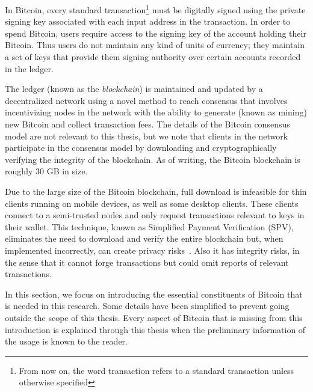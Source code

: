 In Bitcoin, every standard transaction\footnote{From now on, the word transaction refers to a standard transaction unless otherwise specified} must be digitally signed using the private signing key associated with each input address in the transaction. In order to spend Bitcoin, users require access to the signing key of the account holding their Bitcoin. Thus users do not maintain any kind of units of currency; they maintain a set of keys that provide them signing authority over certain accounts recorded in the ledger. 

The ledger (known as the \emph{blockchain}) is maintained and updated by a decentralized network using a novel method to reach consensus that involves incentivizing nodes in the network with the ability to generate (known as mining) new Bitcoin and collect transaction fees. The details of the Bitcoin consensus model are not relevant to this thesis, but we note that clients in the network participate in the consensus model by downloading and cryptographically verifying the integrity of the blockchain. As of writing, the Bitcoin blockchain is roughly 30 GB in size.


Due to the large size of the Bitcoin blockchain, full download is infeasible for thin clients running on mobile devices, as well as some desktop clients. These clients connect to a semi-trusted nodes and only request transactions relevant to keys in their wallet. This technique, known as Simplified Payment Verification (SPV), eliminates the need to download and verify the entire blockchain but, when implemented incorrectly, can create privacy risks~\cite{SPVbugs}. Also it has integrity risks, in the sense that it cannot forge transactions but could omit reports of relevant transactions.


In this section, we focus on introducing the essential constituents of Bitcoin that is needed in this research. Some details have been simplified to prevent going outside the scope of this thesis. Every aspect of Bitcoin that is missing from this introduction is explained through this thesis when the preliminary information of the usage is known to the reader.


